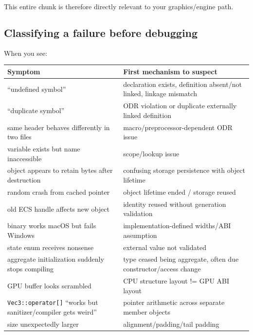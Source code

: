 This entire chunk is therefore directly relevant to your graphics/engine path.

\subsection{Classifying a failure before debugging}\label{classifying-a-failure-before-debugging}

When you see:

{\def\LTcaptype{none} %
\begin{longtable}[]{@{}
  >{\raggedright\arraybackslash}p{}
  >{\raggedright\arraybackslash}p{}@{}}
\toprule\noalign{}
\begin{minipage}[b]{\linewidth}\raggedright
Symptom
\end{minipage} & \begin{minipage}[b]{\linewidth}\raggedright
First mechanism to suspect
\end{minipage} \\
\midrule\noalign{}
\endhead
\bottomrule\noalign{}
\endlastfoot
``undefined symbol'' & declaration exists, definition absent/not linked, linkage mismatch \\
``duplicate symbol'' & ODR violation or duplicate externally linked definition \\
same header behaves differently in two files & macro/preprocessor-dependent ODR issue \\
variable exists but name inaccessible & scope/lookup issue \\
object appears to retain bytes after destruction & confusing storage persistence with object lifetime \\
random crash from cached pointer & object lifetime ended / storage reused \\
old ECS handle affects new object & identity reused without generation validation \\
binary works macOS but fails Windows & implementation-defined widths/ABI assumption \\
state enum receives nonsense & external value not validated \\
aggregate initialization suddenly stops compiling & type ceased being aggregate, often due constructor/access change \\
GPU buffer looks scrambled & CPU structure layout != GPU ABI layout \\
\texttt{Vec3::operator{[}{]}} ``works but sanitizer/compiler gets weird'' & pointer arithmetic across separate member objects \\
size unexpectedly larger & alignment/padding/tail padding \\
\end{longtable}
}

